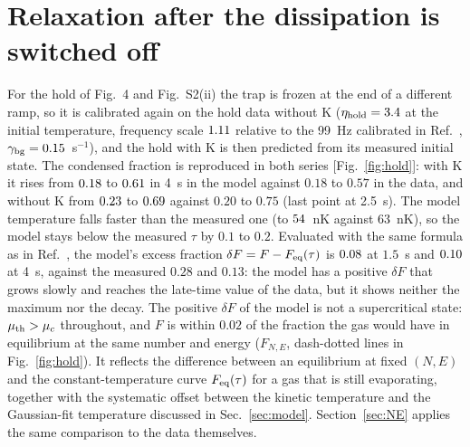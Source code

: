 \section{Relaxation after the dissipation is switched off}
\label{sec:hold}
For the hold of Fig.~4 and Fig.~S2(ii) the trap is frozen at the end of a
different ramp, so it is calibrated again on the hold data without K
($\eta_{\rm hold}=3.4$ at the initial temperature, frequency scale
$1.11$ relative to the 99~Hz calibrated in Ref.~\cite{MelladoMunoz2020},
$\gamma_{\rm bg}=0.15$~s$^{-1}$), and the hold with K is then predicted
from its measured initial state. The condensed fraction is reproduced in both
series [Fig.~\ref{fig:hold}]: with K it rises from $0.18$ to $0.61$ in
4~s in the model against $0.18$ to $0.57$ in the data, and without K from
$0.23$ to $0.69$ against $0.20$ to $0.75$ (last point at 2.5~s). The model temperature
falls faster than the measured one (to $54$~nK against $63$~nK), so the
model stays below the measured $\tau$ by $0.1$ to $0.2$. Evaluated with the
same formula as in Ref.~\cite{MelladoMunoz2020}, the model's excess fraction
$\delta F=F-F_{\rm eq}(\tau)$ is $0.08$ at $1.5$~s and $0.10$ at
4~s, against the measured $0.28$ and $0.13$: the model has a positive $\delta F$ that grows slowly and reaches the
late-time value of the data, but it shows neither the maximum nor the decay. The positive $\delta F$ of the model is not a
supercritical state: $\mu_{\rm th}>\mu_c$ throughout, and $F$ is within
$0.02$ of the fraction the gas would have in equilibrium at the same number
and energy ($F_{N,E}$, dash-dotted lines in Fig.~\ref{fig:hold}). It
reflects the difference between an equilibrium at fixed $(N,E)$ and the
constant-temperature curve $F_{\rm eq}(\tau)$ for a gas that is still
evaporating, together with the systematic offset between the kinetic
temperature and the Gaussian-fit temperature discussed in
Sec.~\ref{sec:model}. Section~\ref{sec:NE} applies the same comparison to
the data themselves.

